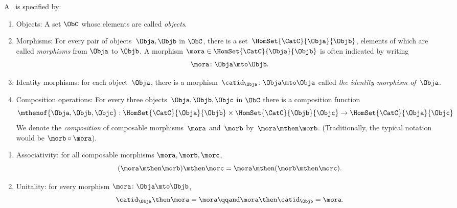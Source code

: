 {\begin{forslides}
		\begin{ctdefinition}
			\label{def:category-var}
			A \emph{}~\CatC is specified by:
			\begin{body}
				\constit
				\begin{enumerate}
					\item Objects: A set $\ObC$ whose elements are called \emph{objects}.
					\item Morphisms: For every pair of objects~$\Obja,\Objb$ in $\ObC$, there is a set~$\HomSet{\CatC}{\Obja}{\Objb}$, elements of which are called \emph{morphisms} from $\Obja$ to $\Objb$.
					      A morphism $\mora \in \HomSet{\CatC}{\Obja}{\Objb}$ is often indicated by writing
					      \begin{equation*}
						      \mora \colon \Obja \mto \Objb.
					      \end{equation*}
					\item Identity morphisms: for each object~$\Obja$, there is a morphism~$\catid_{\Obja}\colon \Obja \mto \Obja$  called \emph{the identity morphism of~$\Obja$}.
					\item Composition operations: For every three objects~$\Obja,\Objb,\Objc$ in $\ObC$ there is a composition function
					      \begin{equation*}
						      \mthenof{\Obja,\Objb,\Objc}: \HomSet{\CatC}{\Obja}{\Objb} \times \HomSet{\CatC}{\Objb}{\Objc}\to \HomSet{\CatC}{\Obja}{\Objc}
					      \end{equation*}
					      We denote the \emph{composition} of composable morphisms~$\mora$ and~$\morb$ by~$\mora \mthen \morb$.
					      (Traditionally, the typical notation would be $\morb \circ \mora$).

				\end{enumerate}
				\condit
				\begin{enumerate}
					\item Associativity: for all composable morphisms $\mora, \morb, \morc$,
					      \begin{equation}
						      (\mora\mthen \morb)
						      \mthen \morc= \mora \mthen (\morb \mthen \morc).
					      \end{equation}
					\item Unitality: for every morphism $\mora \colon \Obja \mto \Objb$,
					      \begin{equation}
						      \catid_{\Obja} \then \mora = \mora \qqand \mora \then \catid_{\Objb} = \mora.
					      \end{equation}
				\end{enumerate}
			\end{body}
		\end{ctdefinition}


\end{forslides}}
